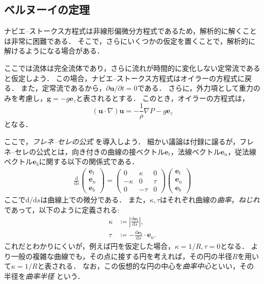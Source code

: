 \documentclass[uplatex,dvipdfmx,a4j,11pt]{jsreport}
\newcommand{\e}{\mathbf{e}} %
\newcommand{\diff}{\mathrm{d}} %
\numberwithin{equation}{chapter}
\begin{document}
\subsection{ベルヌーイの定理}
ナビエ--ストークス方程式は非線形偏微分方程式であるため，解析的に解くことは非常に困難である．
そこで，さらにいくつかの仮定を置くことで，解析的に解けるようになる場合がある．

ここでは流体は完全流体であり，さらに流れが時間的に変化しない定常流であると仮定しよう．
この場合，ナビエ--ストークス方程式はオイラーの方程式に戻る．
また，定常流であるから，$\partial \mathbf{u}/\partial t = 0$である．
さらに，外力項として重力のみを考慮し，$\mathbf{g} = -g \e_z$と表されるとする．
このとき，オイラーの方程式は， 
\begin{equation*}
  (\mathbf{u}\cdot \nabla)\mathbf{u} = -\frac{1}{\rho} \nabla P - g \e_z
\end{equation*}
となる．

ここで，\emph{フレネ--セレの公式} を導入しよう．
細かい議論は付録に譲るが，フレネ--セレの公式とは，向き付きの曲線の接ベクトル$\e_t$，法線ベクトル$\e_n$，従法線ベクトル$\e_b$に関する以下の関係式である．
\begin{align*}
  \frac{\diff }{\diff s}
  \begin{pmatrix}
    \e_t \\
    \e_n \\
    \e_b
  \end{pmatrix}
  =
  \begin{pmatrix}
    0 & \kappa & 0\\
    -\kappa & 0 & \tau\\
    0 & -\tau & 0
  \end{pmatrix}
  \begin{pmatrix}
    \e_t \\
    \e_n \\
    \e_b
  \end{pmatrix}
\end{align*}
ここで$\diff/\diff s$は曲線上での微分である．
また，$\kappa, \tau$はそれぞれ曲線の\emph{曲率}，\emph{ねじれ}であって，以下のように定義される:
\begin{align*}
  \kappa &\coloneqq \left|\frac{\diff \e_t}{\diff s}\right|,\\
  \tau &\coloneqq -\frac{\diff \e_b}{\diff s} \cdot \e_n.
\end{align*}
これだとわかりにくいが，例えば円を仮定した場合，$\kappa = 1/R, \tau = 0$となる．
より一般の複雑な曲線でも，その点に接する円を考えれば，その円の半径$R$を用いて$\kappa = 1/R$と表される．
なお，この仮想的な円の中心を\emph{曲率中心}といい，その半径を\emph{曲率半径} という．
\end{document}

